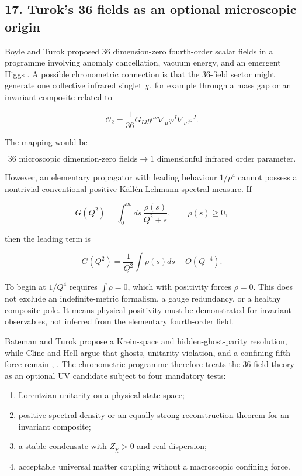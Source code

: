 \documentclass[
]{article}
\providecommand{\tightlist}{%
  \setlength{\itemsep}{0pt}\setlength{\parskip}{0pt}}
\begin{document}
\subsection{17. Turok's 36 fields as an optional microscopic
origin}\label{turoks-36-fields-as-an-optional-microscopic-origin}

Boyle and Turok proposed 36 dimension-zero fourth-order scalar fields in
a programme involving anomaly cancellation, vacuum energy, and an
emergent Higgs . A possible
chronometric connection is that the 36-field sector might generate one
collective infrared singlet \(\chi\), for example through a mass gap or
an invariant composite related to

\[
\mathcal O_2
=\frac1{36}G_{IJ}g^{\mu\nu}
\nabla_\mu\varphi^I\nabla_\nu\varphi^J.
\]

The mapping would be

\[
36\text{ microscopic dimension-zero fields}
\longrightarrow
1\text{ dimensionful infrared order parameter}.
\]

However, an elementary propagator with leading behaviour \(1/p^4\)
cannot possess a nontrivial conventional positive Källén-Lehmann
spectral measure. If

\[
G(Q^2)=\int_0^\infty ds\,\frac{\rho(s)}{Q^2+s},
\qquad\rho(s)\ge0,
\]

then the leading term is

\[
G(Q^2)=\frac1{Q^2}\int\rho(s)ds+O(Q^{-4}).
\]

To begin at \(1/Q^4\) requires \(\int\rho=0\), which with positivity
forces \(\rho=0\). This does not exclude an indefinite-metric formalism,
a gauge redundancy, or a healthy composite pole. It means physical
positivity must be demonstrated for invariant observables, not inferred
from the elementary fourth-order field.

Bateman and Turok propose a Krein-space and hidden-ghost-parity
resolution, while Cline and Hell argue that ghosts, unitarity violation,
and a confining fifth force remain
,
. The chronometric programme
therefore treats the 36-field theory as an optional UV candidate subject
to four mandatory tests:

\begin{enumerate}
\def\labelenumi{\arabic{enumi}.}
\tightlist
\item
  Lorentzian unitarity on a physical state space;
\item
  positive spectral density or an equally strong reconstruction theorem
  for an invariant composite;
\item
  a stable condensate with \(Z_\chi>0\) and real dispersion;
\item
  acceptable universal matter coupling without a macroscopic confining
  force.
\end{enumerate}
\end{document}
